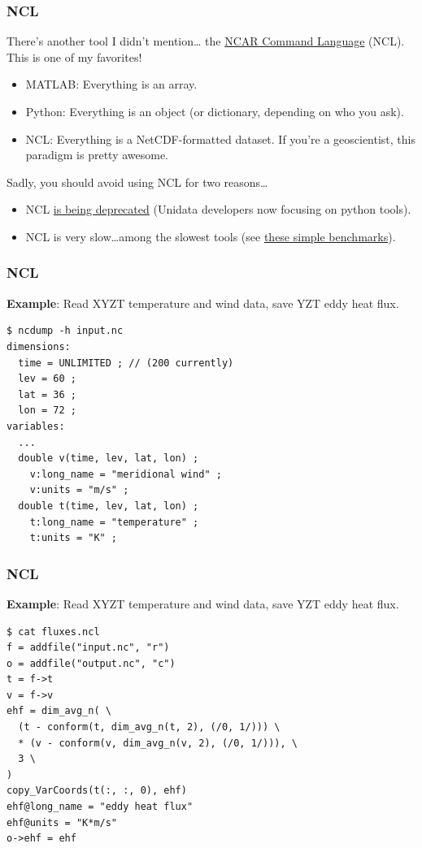 \documentclass[aspectratio=169]{beamer}
\makeatletter
\newcommand{\verbatimfont}[1]{\renewcommand{\verbatim@font}{\ttfamily#1}}
\makeatother
\begin{document}
\begin{frame}[fragile]
  \frametitle{NCL}

  There's another tool I didn't mention\ldots
  the \href{https://www.ncl.ucar.edu}{NCAR Command Language} (NCL).
  This is one of my favorites!
  \begin{itemize}
    \item
      MATLAB: Everything is an array.
    \item
      Python: Everything is an object (or dictionary, depending on who you ask).
    \item
      {\color{red}NCL}: Everything is a NetCDF-formatted dataset.
      If you're a geoscientist, this paradigm is pretty awesome.
  \end{itemize}

  Sadly, you should avoid using NCL for two reasons\ldots
  \begin{itemize}
    \item
      NCL \href{https://www.ncl.ucar.edu/Document/Pivot_to_Python/september_2019_update.shtml}{is being deprecated}
      (Unidata developers now focusing on python tools).
    \item
      NCL is very slow\ldots among the slowest tools
      (see \href{https://github.com/lukelbd/atmos-benchmarks}{these simple benchmarks}).
  \end{itemize}
\end{frame}


\begin{frame}[fragile]

  \frametitle{NCL}

  \textbf{Example}: Read XYZT temperature and wind data, save YZT eddy heat flux.

\verbatimfont{\footnotesize}%
\begin{verbatim}
$ ncdump -h input.nc
dimensions:
  time = UNLIMITED ; // (200 currently)
  lev = 60 ;
  lat = 36 ;
  lon = 72 ;
variables:
  ...
  double v(time, lev, lat, lon) ;
    v:long_name = "meridional wind" ;
    v:units = "m/s" ;
  double t(time, lev, lat, lon) ;
    t:long_name = "temperature" ;
    t:units = "K" ;
\end{verbatim}

\end{frame}

\begin{frame}[fragile]

  \frametitle{NCL}

  \textbf{Example}: Read XYZT temperature and wind data, save YZT eddy heat flux.

  \verbatimfont{\footnotesize}%
\begin{verbatim}
$ cat fluxes.ncl
f = addfile("input.nc", "r")
o = addfile("output.nc", "c")
t = f->t
v = f->v
ehf = dim_avg_n( \
  (t - conform(t, dim_avg_n(t, 2), (/0, 1/))) \
  * (v - conform(v, dim_avg_n(v, 2), (/0, 1/))), \
  3 \
)
copy_VarCoords(t(:, :, 0), ehf)
ehf@long_name = "eddy heat flux"
ehf@units = "K*m/s"
o->ehf = ehf
\end{verbatim}

\end{frame}
\end{document}
